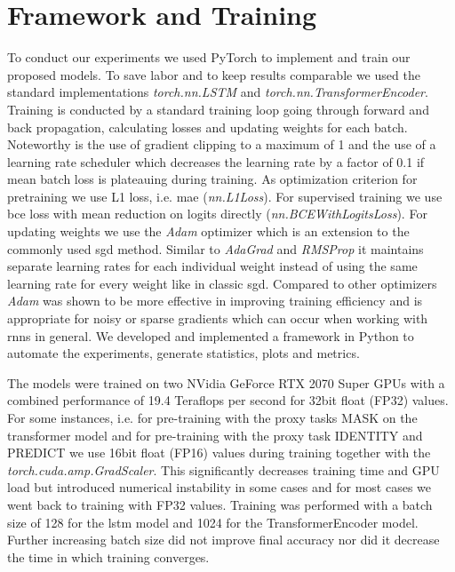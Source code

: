 
\section{Framework and Training} \label{sec:methodology:freamework_and_training}

To conduct our experiments we used PyTorch \cite{pytorch} to implement and train our proposed models. To save labor and to keep results comparable we used the standard implementations \textit{torch.nn.LSTM} and \textit{torch.nn.TransformerEncoder}. Training is conducted by a standard training loop going through forward and back propagation, calculating losses and updating weights for each batch. Noteworthy is the use of gradient clipping to a maximum of 1 and the use of a learning rate scheduler which decreases the learning rate by a factor of 0.1 if mean batch loss is plateauing during training. As optimization criterion for pretraining we use L1 loss, i.e. \gls{mae} (\textit{nn.L1Loss}). For supervised training we use \gls{bce} loss with mean reduction on logits directly (\textit{nn.BCEWithLogitsLoss}).
For updating weights we use the \textit{Adam} optimizer \cite{adam} which is an extension to the commonly used \gls{sgd} method. Similar to \textit{AdaGrad} \cite{optimizer_comparison} and \textit{RMSProp} \cite{optimizer_comparison} it maintains separate learning rates for each individual weight instead of using the same learning rate for every weight like in classic \gls{sgd}. Compared to other optimizers \textit{Adam} was shown to be more effective in improving training efficiency \cite{adam} and is appropriate for noisy or sparse gradients which can occur when working with \glspl{rnn} in general.
We developed and implemented a framework in Python to automate the experiments, generate statistics, plots and metrics. \par
The models were trained on two NVidia GeForce RTX 2070 Super GPUs with a combined performance of 19.4 Teraflops per second for 32bit float (FP32) values. For some instances, i.e. for pre-training with the proxy tasks MASK on the transformer model and for pre-training with the proxy task IDENTITY and PREDICT we use 16bit float (FP16) values during training together with the \textit{torch.cuda.amp.GradScaler}. This significantly decreases training time and GPU load but introduced numerical instability in some cases and for most cases we went back to training with FP32 values. Training was performed with a batch size of 128 for the \gls{lstm} model and 1024 for the TransformerEncoder model. Further increasing batch size did not improve final accuracy nor did it decrease the time in which training converges. \par

